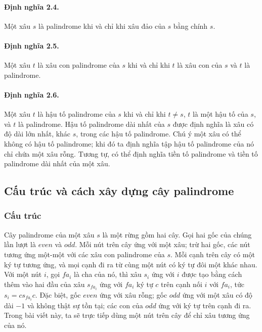 \documentclass[11pt]{article}
\begin{document}
\paragraph{Định nghĩa 2.4.}
Một xâu \(s\) là palindrome khi và chỉ khi xâu đảo của \(s\) bằng chính \(s\).

\paragraph{Định nghĩa 2.5.}
Một xâu \(t\) là xâu con palindrome của \(s\) khi và chỉ khi \(t\) là xâu con
của \(s\) và \(t\) là palindrome.

\paragraph{Định nghĩa 2.6.}
Một xâu \(t\) là hậu tố palindrome của \(s\) khi và chỉ khi \(t\ne s\), \(t\)
là một hậu tố của \(s\), và \(t\) là palindrome. Hậu tố palindrome dài nhất
của \(s\) được định nghĩa là xâu có độ dài lớn nhất, khác \(s\), trong các hậu
tố palindrome. Chú ý một xâu có thể không có hậu tố palindrome; khi đó ta định
nghĩa tập hậu tố palindrome của nó chỉ chứa một xâu rỗng. Tương tự, có thể
định nghĩa tiền tố palindrome và tiền tố palindrome dài nhất của một xâu.

\subsection{Cấu trúc và cách xây dựng cây palindrome}

\subsubsection{Cấu trúc}

Cây palindrome của một xâu \(s\) là một rừng gồm hai cây. Gọi hai gốc của
chúng lần lượt là \(\textit{even}\) và \(\textit{odd}\). Mỗi nút trên cây ứng
với một xâu; trừ hai gốc, các nút tương ứng một-một với các xâu con palindrome
của \(s\). Mỗi cạnh trên cây có một ký tự tương ứng, và mọi cạnh đi ra từ cùng
một nút có ký tự đôi một khác nhau. Với một nút \(i\), gọi \(fa_i\) là cha của
nó, thì xâu \(s_i\) ứng với \(i\) được tạo bằng cách thêm vào hai đầu của xâu
\(s_{fa_i}\) ứng với \(fa_i\) ký tự \(c\) trên cạnh nối \(i\) với \(fa_i\),
tức \(s_i=cs_{fa_i}c\). Đặc biệt, gốc \(\textit{even}\) ứng với xâu rỗng; gốc
\(\textit{odd}\) ứng với một xâu có độ dài \(-1\) và không thật sự tồn tại;
các con của \(\textit{odd}\) ứng với ký tự trên cạnh đi ra. Trong bài viết này,
ta sẽ trực tiếp dùng một nút trên cây để chỉ xâu tương ứng của nó.
\end{document}
